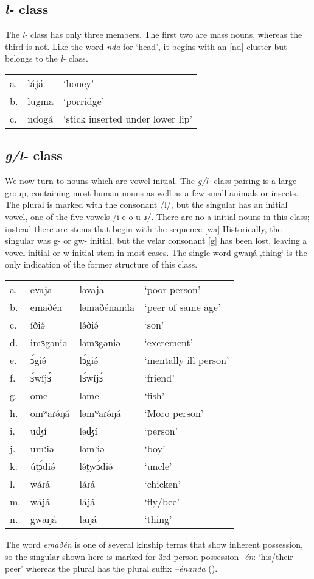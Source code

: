 \subsection{\textit{l-} class}

The \textit{l-} class has only three members. The first two are mass nouns, whereas the third is not. Like the word \textit{nda} for ‘head’, it begins with an [nd] cluster but belongs to the \textit{l-} class. 

\ea
\begin{tabular}[t]{lll}
a.	&	lájá		&	‘honey’\\
b.	&	lugma		&	‘porridge’\\
c.	&	ndogá		&	‘stick inserted under lower lip’\\
\end{tabular}	
\z

\subsection{\textit{g/l-} class}\label{section:glclass}

We now turn to nouns which are vowel-initial. The \textit{g/l-} class pairing is a large group, containing most human nouns as well as a few small animals or insects. The plural is marked with the consonant /l/, but the singular has an initial vowel, one of the five vowels /i e o u ɜ/. There are no a-initial nouns in this class; instead there are stems that begin with the sequence [wa]  Historically, the singular was g- or gw- initial, but the velar consonant [g] has been lost, leaving a vowel initial or w-initial stem in most cases. The single word gwaŋá ‚thing‘ is the only indication of the former structure of this class. 

\ea
\begin{tabular}[t]{llll}	
a.	&	evaja	&	ləvaja		&	‘poor person’\\
b.	&	emaðén	&	ləmaðénanda	&	‘peer of same age’\\
c.	&	íðiə́		&	lə́ðiə́			&	‘son’\\
d.	&	imɜgəniə&	ləmɜgəniə	&	‘excrement’\\
e.	&	ɜ́giə́		&	lɜ́giə́		&	‘mentally ill person’\\ %
f.	&	ɜ́wíjɜ́	&	lɜ́wíjɜ́		&	‘friend’\\
g.	&	ome		&	ləme			&	‘fish’\\
h.	&	omʷaɾə́ŋá	&	ləmʷaɾə́ŋá	&	‘Moro person’\\
i.	&	uʤí		&	ləʤí		&	‘person’\\
j.	&	umːiə	&	ləmːiə		&	‘boy’\\
k.	&	út̪ɜ́diə́	&	lə́t̪wɜ́diə́		&	‘uncle’\\
l.	&	wáɾá	&	láɾá		&	‘chicken’\\
m.	&	wájá	&	lájá			&	‘fly/bee’ \\
n.	&	gwaŋá	&	laŋá		&	‘thing’\\
\end{tabular}
\z
The word \textit{emaðén} is one of several kinship terms that show inherent possession, so the singular shown here is marked for 3rd person possession \textit{-én}: ‘his/their peer’ whereas the plural has the plural suffix \textit{–énanda} ().

